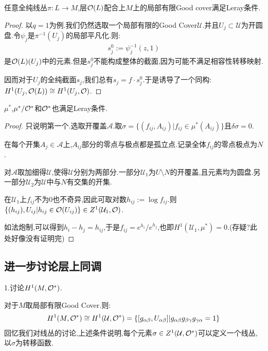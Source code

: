 \begin{lemma}
	任意全纯线丛$\pi:L \to M$,层$\mathcal{O}(L)$配合上$M$上的局部有限Good cover满足Leray条件.
\end{lemma}
\begin{proof}
	以$q=1$为例.我们仍然选取一个局部有限的Good Cover$\mathcal{U}$.并且$U_j \subset \mathcal{U}$为开圆盘.令$\psi_j$是$\pi^{-1}(U_j)$的局部平凡化.则:
	\begin{align*}
		s_j^0:=\psi_j^{-1}(z,1)
	\end{align*}
	是$\mathcal{O}(L)(U_j)$中的元素.但是$s_j^0$不能构成整体的截面,因为可能不满足相容性转移映射.

	因而对于$U_j$的全纯截面$s_j$,我们总有$s_j=f \cdot s_j^0$.于是诱导了一个同构:$H^1(U_j,\mathcal{O}(L))\cong H^1(U_j,\mathcal{O})$.
\end{proof}
\begin{lemma}
	$\mu^*$,$\mu^*/\mathcal{O}^*$和$\mathcal{O}^*$也满足Leray条件.
\end{lemma}
\begin{proof}
    只说明第一个.选取开覆盖$\mathcal{A}$.取$\sigma=\{(f_{ij},A_{ij})|f_{ij}\in \mu^*(A_{ij})\}$且$\delta \sigma=0$.

	在每个开集$A_j\in \mathcal{A}$上,$A_{ij}$部分的零点与极点都是孤立点.记录全体$f_{ij}$的零点极点为$N$.

	对$\mathcal{A}$取加细得$\mathcal{U}$,使得$\mathcal{U}$分别为两部分.一部分$\mathcal{U}_1$为$U\setminus N$的开覆盖,且元素均为圆盘.另一部分$\mathcal{U}_2$为$\mathcal{U}$中与$N$有交集的开集.

	在$\mathcal{U}_1$上$f_{ij}$不为$0$也不奇异,因此可取对数$h_{ij}:=\log f_{ij}$.则$\{(h_{ij}),U_{ij}|h_{ij}\in \mathcal{O}(U_{ij})\} \in Z^1(\mathcal{U}_1,\mathcal{O})$.

	如法炮制,可以得到$h_i-h_j=h_{ij}$,于是$f_{ij}=e^{h_i}/e^{h_j}$,也即$H^1(\mathcal{U}_1,\mu^*)=0$.(存疑?此处好像没有证明完)
\end{proof}

\subsection*{进一步讨论层上同调}
1.讨论$H^1(M,\mathcal{O}^*)$.

对于$M$取局部有限Good Cover.则:
\begin{align*}
	H^1(M,\mathcal{O}^*)\cong H^1(\mathcal{U},\mathcal{O}^*)=\{[g_{\alpha\beta},U_{\alpha\beta}]|g_{\alpha\beta}g_{\beta\gamma}g_{\gamma\alpha}=1\}
\end{align*}
回忆我们对线丛的讨论,上述条件说明,每个元素$\sigma \in Z^1(\mathcal{U},\mathcal{O}^*)$可以定义一个线丛,以$\sigma$为转移函数.


